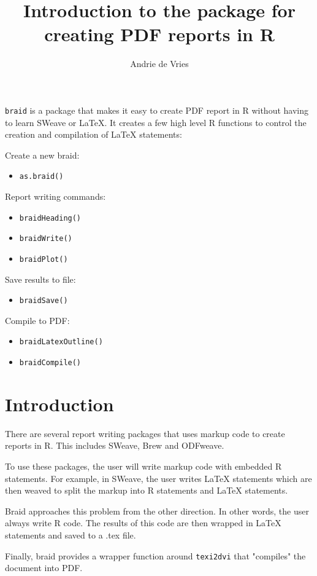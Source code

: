 \documentclass[a4paper]{article}
\title{Introduction to the \braid{} package for creating PDF reports in R}
\author{Andrie de Vries}
\newcommand{\braid}{{\tt braid}}
\newcommand{\code}[1]{{\tt #1}}
\begin{document}
\maketitle

\braid{} is a package that makes it easy to create PDF report in R without having to learn SWeave or \LaTeX{}.  It creates a few high level R functions to control the creation and compilation of \LaTeX{} statements:

Create a new braid: 
\begin{itemize}
	\item \code{as.braid()}
\end{itemize}

Report writing commands:
\begin{itemize}
	\item \code{braidHeading()}
	\item \code{braidWrite()}
	\item \code{braidPlot()}
\end{itemize}

Save results to file:
\begin{itemize}
	\item \code{braidSave()}
\end{itemize}

Compile to PDF:
\begin{itemize}
	\item \code{braidLatexOutline()}
	\item \code{braidCompile()}
\end{itemize}
	

\section{Introduction}

There are several report writing packages that uses markup code to create reports in R.  This includes SWeave, Brew and ODFweave.

To use these packages, the user will write markup code with embedded R statements.  For example, in SWeave, the user writes \LaTeX{} statements which are then weaved to split the markup into R statements and \LaTeX{} statements.

Braid approaches this problem from the other direction.  In other words, the user always write R code.  The results of this code are then wrapped in \LaTeX{} statements and saved to a .tex file.

Finally, braid provides a wrapper function around \code{texi2dvi}
that "compiles" the document into PDF.
\end{document}
